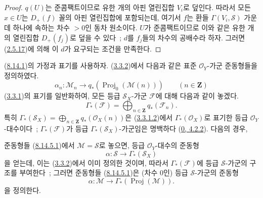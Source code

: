 \begin{proof}
$q(U)$는 준콤팩트이므로 유한 개의 아핀 열린집합 $V_i$로 덮인다.
따라서 모든 $x\in U$는 $D_+(f)$ 꼴의 아핀 열린집합에 포함되는데,
여기서 $f$는 환들 $\Gamma(V_i,\mathcal{S})$ 가운데 하나에 속하는 차수
$>0$인 동차 원소이다. $U$가 준콤팩트이므로 이와 같은 유한 개의
열린집합 $D_+(f_j)$로 덮을 수 있다~; $d$를 $f_j$들의 차수의
공배수라 하자. 그러면 (\hyperref[II.2.5.17-ko]{2.5.17})에 의해 이 $d$가
요구되는 조건을 만족한다.
\end{proof}

\begin{env}[8.14.5]
\label{II.8.14.5-ko}
(\hyperref[II.8.14.1-ko]{8.14.1})의 가정과 표기를 사용하자.
(\hyperref[II.3.3.2-ko]{3.3.2})에서 다음과 같은 표준
$\mathcal{O}_Y$-가군 준동형들을 정의하였다.
\begin{equation}
\label{II.8.14.5.1-ko}
  \alpha_n:\mathcal{M}_n\to
  q_*(\operatorname{Proj}_0(\mathcal{M}(n)))
  \qquad(n\in\mathbf{Z})
\tag{8.14.5.1}
\end{equation}
(\hyperref[II.3.3.1-ko]{3.3.1})의 표기를 일반화하여, 모든 등급
$\mathcal{S}_X$-가군 $\mathcal{F}$에 대해 다음과 같이 놓겠다.
\begin{equation}
\label{II.8.14.5.2-ko}
  \Gamma_*(\mathcal{F})=
  \bigoplus_{n\in\mathbf{Z}}q_*(\mathcal{F}_n).
\tag{8.14.5.2}
\end{equation}
특히
$\Gamma_*(\mathcal{S}_X)=\bigoplus_{n\in\mathbf{Z}}q_*(\mathcal{O}_X(n))$은
(\hyperref[II.3.3.1.2-ko]{3.3.1.2})에서 $\Gamma_*(\mathcal{O}_X)$로
표기한 등급 $\mathcal{O}_Y$-대수이다~; $\Gamma_*(\mathcal{F})$가 등급
$\Gamma_*(\mathcal{S}_X)$-가군임은 명백하다
(\hyperref[0.4.2.2-ko]{0, 4.2.2}). 다음의 경우,

준동형들 (\hyperref[II.8.14.5.1-ko]{8.14.5.1})에서
$\mathcal{M}=\mathcal{S}$로 놓으면, 등급 $\mathcal{O}_Y$-대수의 준동형
\begin{equation}
\label{II.8.14.5.3-ko}
  \alpha:\mathcal{S}\to\Gamma_*(\mathcal{S}_X)
\tag{8.14.5.3}
\end{equation}
을 얻는데, 이는 (\hyperref[II.3.3.2-ko]{3.3.2})에서 이미 정의한 것이며,
따라서 $\Gamma_*(\mathcal{F})$에 등급 $\mathcal{S}$-가군의 구조를
부여한다~; 그러면 준동형들
(\hyperref[II.8.14.5.1-ko]{8.14.5.1})은 (차수 $0$인) 등급
$\mathcal{S}$-가군의 준동형
\begin{equation}
\label{II.8.14.5.4-ko}
  \alpha:\mathcal{M}\to\Gamma_*(\operatorname{Proj}(\mathcal{M})).
\tag{8.14.5.4}
\end{equation}
을 정의한다.
\end{env}

